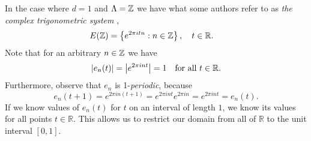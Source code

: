 \documentclass[../thesis.tex]{subfiles}
\begin{document}
\begin{example}
    In the case where $d=1$ and $\Lambda = \mathbb{Z}$ we have what some authors refer to as \emph{the complex trigonometric system} \cite{heilMetricsNormsInner2018} \cite{encyclopediaofmathematicsTrigonometricSystem},
    \begin{align*}
        E(\mathbb{Z}) &= \left\{e^{2\pi i t n} : n \in \mathbb{Z}\right\}, \quad t\in \mathbb{R}.
    \end{align*}
    Note that for an arbitrary $n \in \mathbb{Z}$ we have
    \begin{equation*}
        \left|e_{n}(t) \right|= \left|e^{2 \pi i n t}\right| = 1 \quad \text{for all } t\in \mathbb{R}.
    \end{equation*}
    Furthermore, observe that $e_n$ is 1-\emph{periodic}, because
    \begin{equation*}
        e_n(t+1) = e^{2 \pi i n (t+1)} = e^{2 \pi i n t} e^{2 \pi i n} = e^{2 \pi i n t} = e_n(t).
    \end{equation*}
    If we know values of $e_n(t)$ for $t$ on an interval of length $1$, we know its values for all points $t\in \mathbb{R}$. This allows us to restrict our domain from all of $\mathbb{R}$ to the unit interval $[0,1]$.
\end{example}
\end{document}
